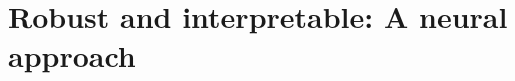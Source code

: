 


%

\chapter{Robust and interpretable: A neural approach  \label{chapter:emnlp2017}}

%
%




%




%
%
%
%
